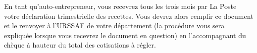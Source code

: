 ﻿En tant qu'auto-entrepreneur, vous recevrez tous les trois mois par La Poste votre déclaration trimestrielle des recettes. Vous devrez alors remplir ce document et le renvoyer à l'URSSAF de votre département (la procédure vous sera expliquée lorsque vous recevrez le document en question) en l'accompagnant du chèque à hauteur du total des cotisations à régler.